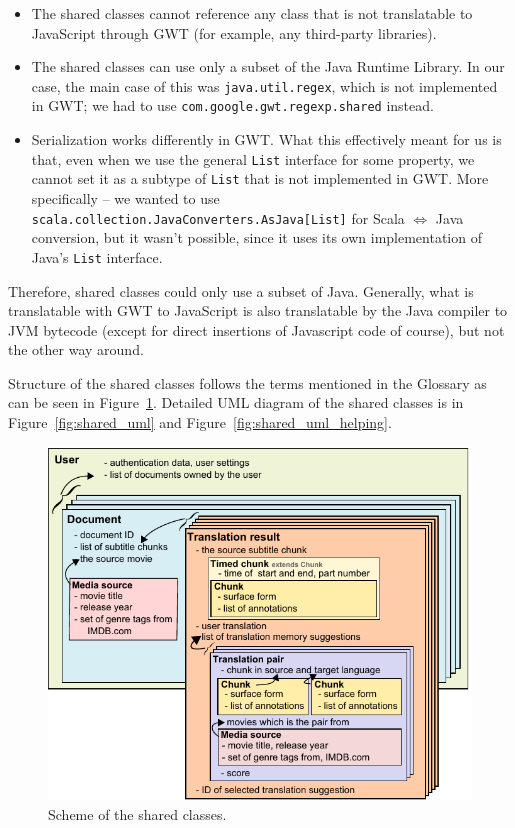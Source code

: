 \begin{itemize}
\item The shared classes cannot reference any class that is not translatable to JavaScript through GWT (for example, any third-party libraries).
\item The shared classes can use only a subset of the Java Runtime Library. In our case, the main case of this was \texttt{java.util.regex}, which is not implemented in GWT; we had to use \texttt{com.google.gwt.regexp.shared} instead.
\item Serialization works differently in GWT. What this effectively meant for us is that, even when we use the general \texttt{List} interface for some property, we cannot set it as a subtype of \texttt{List} that is not implemented in GWT. More specifically -- we wanted to use \texttt{scala.collection.JavaConverters.AsJava[List]} for Scala $\Leftrightarrow$ Java conversion, but it wasn't possible, since it uses its own implementation of Java's \texttt{List} interface.
\end{itemize}

Therefore, shared classes could only use a subset of Java. Generally, what is translatable with GWT to JavaScript is also translatable by the Java compiler to JVM bytecode (except for direct insertions of Javascript code of course), but not the other way around.

Structure of the shared classes follows the terms mentioned in the Glossary as can be seen in Figure~\ref{projectStructure:logical}. Detailed UML diagram of the shared classes is in Figure~\ref{fig:shared_uml} and Figure~\ref{fig:shared_uml_helping}.


\begin{figure}[h]
\begin{center}
\includegraphics{figures/shared_classes.pdf}
\end{center}
\caption{Scheme of the shared classes.}\label{projectStructure:logical}
\end{figure}

